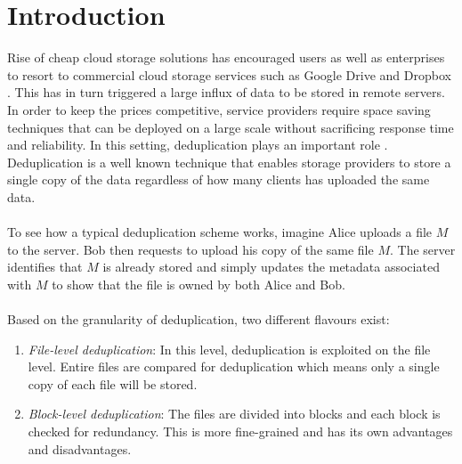\chapter{Introduction}
\label{chap:introduction}

Rise of cheap cloud storage solutions has encouraged users as well as enterprises to
resort to commercial cloud storage services such as Google Drive \cite{googleDrive} and 
Dropbox \cite{dropbox}. This has in turn triggered a large influx of data to be stored
in remote servers. In order to keep the prices competitive, service providers require
space saving techniques that can be deployed on a large scale without sacrificing
response time and reliability. In this setting, deduplication plays an important role \cite{practicaldedup}.
Deduplication is a well known technique that enables storage providers to store a single
copy of the data regardless of how many clients has uploaded the same data.
\\ \\
To see how a typical deduplication scheme works, imagine Alice uploads a file
$M$ to the server. Bob then requests to upload his copy of the same file $M$. The server identifies
that $M$ is already stored and simply updates the metadata associated with $M$ to show
that the file is owned by both Alice and Bob.
\\ \\
Based on the granularity of deduplication, two different flavours exist:
\begin{enumerate}
	\item \textit{File-level deduplication}: In this level, deduplication is
	exploited on the file level. Entire files are compared for deduplication
	which means only a single copy of each file will be stored.
	
	\item \textit{Block-level deduplication}: The files are divided into blocks and
	each block is checked for redundancy. This is more fine-grained and has its own
	advantages and disadvantages.
\end{enumerate}

